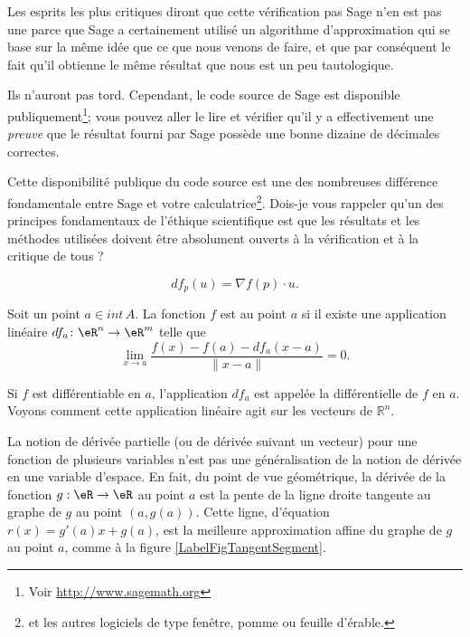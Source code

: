 \begin{remark}
    Les esprits les plus critiques diront que cette vérification pas Sage n'en est pas une parce que Sage a certainement utilisé un algorithme d'approximation qui se base sur la même idée que ce que nous venons de faire, et que par conséquent le fait qu'il obtienne le même résultat que nous est un peu tautologique. 
    
    Ils n'auront pas tord. Cependant, le code source de Sage est disponible publiquement\footnote{Voir \url{http://www.sagemath.org}}; vous pouvez aller le lire et vérifier qu'il y a effectivement une \emph{preuve} que le résultat fourni par Sage possède une bonne dizaine de décimales correctes. 
    
    Cette disponibilité publique du code source est une des nombreuses différence fondamentale entre Sage et votre calculatrice\footnote{et les autres logiciels de type fenêtre, pomme ou feuille d'érable.}. Dois-je vous rappeler qu'un des principes fondamentaux de l'éthique scientifique est que les résultats et les méthodes utilisées doivent être absolument ouverts à la vérification et à la critique de tous ?
\end{remark}

\begin{equation}        \label{Eqdfpunfpdu}
    df_p(u)=\nabla f(p)\cdot u.
\end{equation}

\begin{definition}      \label{DefDifferentiablFnRn}
Soit un point $a \in int\,A$. La fonction $f$ est  au point $a$ si il existe une application linéaire $df_a\colon \eR^n\to \eR^m$ telle que 
\begin{equation}        \label{EqDefDiffableT}
    \lim_{x\to a} \frac{f(x) - f(a) - df_a (x-a)}{\|x-a\|}=0.
\end{equation}
\end{definition}

Si $f$ est différentiable en $a$, l'application $df_a$ est appelée la différentielle de $f$ en $a$. Voyons comment cette application linéaire agit sur les vecteurs de $\mathbb{R}^n$.

La notion de dérivée partielle (ou de dérivée suivant un vecteur) pour une fonction de plusieurs variables n'est pas une  généralisation de la notion de dérivée en une variable d'espace. En fait, du point de vue géométrique, la dérivée de la fonction $g:\eR\to\eR$ au point $a$ est la pente de la ligne droite tangente au graphe de $g$ au point $(a, g(a))$. Cette ligne, d'équation $r(x)=g'(a)x+g(a)$, est la meilleure approximation affine du graphe de $g$ au point $a$, comme à la figure \ref{LabelFigTangentSegment}.
\newcommand{\CaptionFigTangentSegment}{Tangentes au graphe d'une fonction d'une variable}


